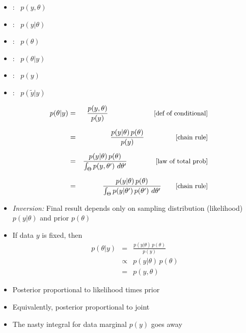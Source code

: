 \documentclass[10pt]{report}
\begin{document}
%
\begin{itemize}
\item {}: \ $p(y,\theta)$
\item {}: \ $p(y|\theta)$
\item {}: \ $p(\theta)$
\item {}: \ $p(\theta|y)$
\item {}: \ $p(y)$
\item {}: \ $p(\tilde{y}|y)$
\end{itemize}


%
\vspace*{-4pt}
\begin{eqnarray*}
    p(\theta|y)
    & = & \frac{p(y,\theta)}{p(y)}
          \hspace*{64pt} \text{\small [def of conditional]}
    \\[6pt]
    & = & \frac{p(y|\theta) \, p(\theta)}{p(y)}
          \hspace*{44pt} \text{\small [chain rule]}
    \\[6pt]
    & = & \frac{p(y|\theta) \, p(\theta)}{\int_{\Theta} p(y,\theta') \ d\theta'}
          \hspace*{40pt} \text{\small [law of total prob]}
    \\[6pt]
    & = & \frac{p(y|\theta) \, p(\theta)}{\int_{\Theta} p(y|\theta') \,
      p(\theta') \ d\theta'}
          \hspace*{20pt} \text{\small [chain rule]}
\end{eqnarray*}
\vfill
\begin{itemize}
\item \emph{Inversion:} Final result depends only on
  sampling distribution (likelihood) $p(y|\theta)$ and prior
  $p(\theta)$
\end{itemize}


%
\begin{itemize}
\item If data $y$ is fixed, then
\begin{eqnarray*}
p(\theta|y)
& = & \frac{p(y|\theta) \, p(\theta)}{p(y)}
\\[6pt]
& \propto & p(y|\theta) \, p(\theta)
\\[6pt]
& = & p(y,\theta)
\end{eqnarray*}
\item Posterior proportional to likelihood times prior
\item Equivalently, posterior proportional to joint
\vfill
\item The nasty integral for data marginal $p(y)$ goes away
\end{itemize}
\end{document}
